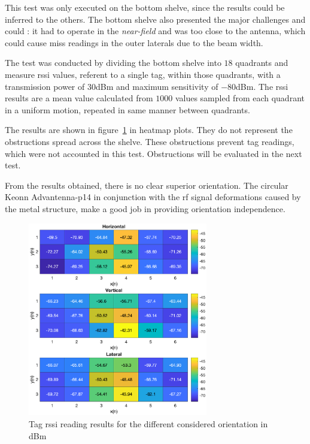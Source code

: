 This test was only executed on the bottom shelve, since the results could be inferred to the others. The bottom shelve also presented the major challenges and could : it had to operate in the \emph{near-field} and was too close to the antenna, which could cause miss readings in the outer laterals due to the beam width.

The test was conducted by dividing the bottom shelve into $18$ quadrants and measure \ac{rssi} values, referent to a single tag, within those quadrants, with a transmission power of $30$dBm and maximum sensitivity of $-80$dBm. The \ac{rssi} results are a mean value calculated from $1000$ values sampled from each quadrant in a uniform motion, repeated in same manner between quadrants.

The results are shown in figure~\ref{fig:tagorientationsresults} in heatmap plots.
They do not represent the obstructions spread across the shelve. These obstructions prevent tag readings, which were not accounted in this test. Obstructions will be evaluated in the next test.

From the results obtained, there is no clear superior orientation. The circular Keonn Advantenna-p14 in conjunction with the \ac{rf} signal deformations caused by the metal structure, make a good job in providing orientation independence.

\begin{figure}
    \centering
    \includegraphics[width=0.7\textwidth]{figs/tests/RSSI_shelve.eps}
    \caption{Tag \ac{rssi} reading results for the different considered orientation in dBm}
    \label{fig:tagorientationsresults}
\end{figure}

